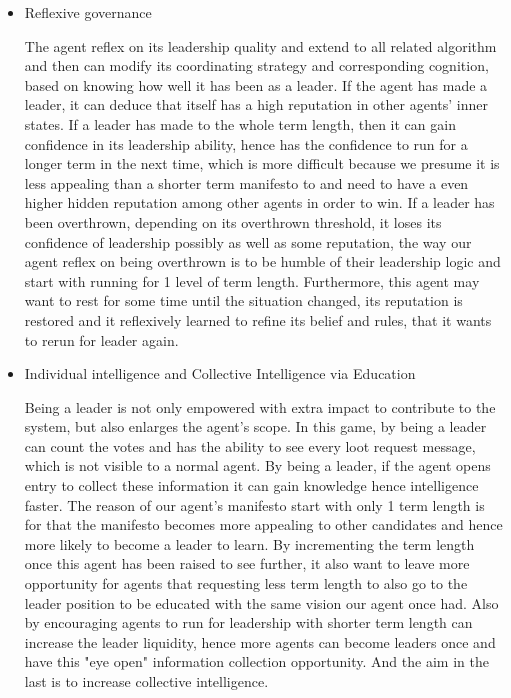\begin{itemize}
    \item Reflexive governance

            \begin{flushleft}
            \setlength{\parindent}{2em}
        The agent reflex on its leadership quality and extend to all related algorithm and then can modify its coordinating strategy and corresponding cognition, based on knowing how well it has been as a leader. If the agent has made a leader, it can deduce that itself has a high reputation in other agents' inner states. If a leader has made to the whole term length, then it can gain confidence in its leadership ability, hence has the confidence to run for a longer term in the next time, which is more difficult because we presume it is less appealing than a shorter term manifesto to and need to have a even higher hidden reputation among other agents in order to win. If a leader has been overthrown, depending on its overthrown threshold, it loses its confidence of leadership possibly as well as some reputation, the way our agent reflex on being overthrown is to be humble of their leadership logic and start with running for 1 level of term length. Furthermore, this agent may want to rest for some time until the situation changed, its reputation is restored and it reflexively learned to refine its belief and rules, that it wants to rerun for leader again.
            \end{flushleft}
    \item Individual intelligence and Collective Intelligence via Education
            \begin{flushleft}
            \setlength{\parindent}{2em}
    		Being  a leader is not only empowered with extra impact to contribute to the system, but also enlarges the agent's scope. In this game, by being a leader can count the votes and has the ability to see every loot request message, which is not visible to a normal agent. By being a leader, if the agent opens entry to collect these information it can gain knowledge hence intelligence  faster. The reason of our agent's manifesto start with only 1 term length is for that the manifesto becomes more appealing to other candidates and hence more likely to become a leader to learn. By incrementing the term length once this agent has been raised to see further, it also want to leave more opportunity for agents that requesting less term length to also go to the leader position to be educated with the same vision our agent once had. Also by encouraging agents to run for leadership with shorter term length can increase the leader liquidity, hence more agents can become leaders once and have this "eye open" information collection opportunity. And the aim in the last is to increase collective intelligence.

\end{flushleft}
\end{itemize}
